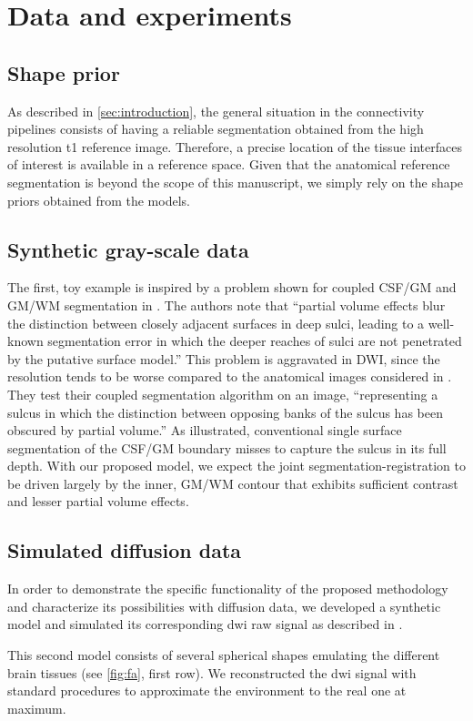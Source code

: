 \section{Data and experiments}
\label{sec:experiments}
%
\subsection{Shape prior}
%
As described in \autoref{sec:introduction}, the general situation in
the connectivity pipelines consists of having 
a reliable segmentation obtained from the high resolution \ac{t1} 
reference image. Therefore, a precise location of the tissue interfaces
of interest is available in a reference space. Given that the anatomical 
reference segmentation is beyond the scope of this manuscript, we simply 
rely on the shape priors obtained from the models.
%
\subsection{Synthetic gray-scale data}
%
The first, toy example is inspired by a problem shown for coupled CSF/GM and GM/WM segmentation in \cite{MacDonald2000}. The authors note that ``partial volume effects blur the distinction between closely adjacent surfaces in deep sulci, leading to a well-known segmentation error in which the deeper reaches of sulci are not penetrated by the putative surface model.'' This problem is aggravated in DWI, since the resolution tends to be worse compared to the anatomical images considered in \cite{MacDonald2000}. They test their coupled segmentation algorithm on an image, ``representing a sulcus in which the distinction between opposing banks of the sulcus has been obscured by partial volume.''  As illustrated, conventional single surface segmentation of the CSF/GM boundary misses to capture the sulcus in its full depth. With our proposed model, we expect the joint segmentation-registration to be driven largely by the inner, GM/WM contour that exhibits sufficient contrast and lesser partial volume effects.
%
\subsection{Simulated diffusion data}
%
In order to demonstrate the specific functionality of the proposed
methodology and characterize its possibilities with diffusion data, we developed a
synthetic model and simulated its corresponding \ac{dwi}
raw signal as described in \citep{tuch_q-ball_2004}. 

This second model consists of several spherical shapes emulating
the different brain tissues (see \autoref{fig:fa}, first row). 
We reconstructed the \ac{dwi} signal with standard procedures to 
approximate the environment to the real one at maximum. \\

